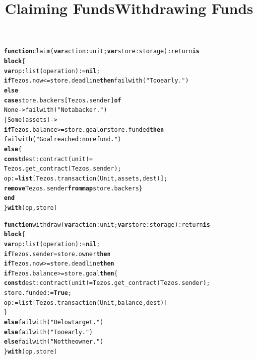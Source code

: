 \documentclass[wide]{slides}
\newcommand{\Kblock}[0]{\textbf{block}\xspace}
\newcommand{\Kcase}[0]{\textbf{case}\xspace}
\newcommand{\Kconst}[0]{\textbf{const}\xspace}
\newcommand{\Kelse}[0]{\textbf{else}\xspace}
\newcommand{\Kend}[0]{\textbf{end}\xspace}
\newcommand{\Kfrom}[0]{\textbf{from}\xspace}
\newcommand{\Kfunction}[0]{\textbf{function}\xspace}
\newcommand{\Kif}[0]{\textbf{if}\xspace}
\newcommand{\Kis}[0]{\textbf{is}\xspace}
\newcommand{\Klist}[0]{\textbf{list}\xspace}
\newcommand{\Kmap}[0]{\textbf{map}\xspace}
\newcommand{\Knil}[0]{\textbf{nil}\xspace}
\newcommand{\Kof}[0]{\textbf{of}\xspace}
\newcommand{\Kor}[0]{\textbf{or}\xspace}
\newcommand{\Kremove}[0]{\textbf{remove}\xspace}
\newcommand{\Kthen}[0]{\textbf{then}\xspace}
\newcommand{\KTrue}[0]{\textbf{True}\xspace}
\newcommand{\Kvar}[0]{\textbf{var}\xspace}
\newcommand{\Kwith}[0]{\textbf{with}\xspace}
\begin{document}
\begin{slide}
  \title{Claiming Funds}

  \begin{alltt}
\Kfunction claim (\Kvar action : unit; \Kvar store : storage) : return \Kis
  \Kblock \{
    \Kvar op : list (operation) := \Knil;
    \Kif Tezos.now <= store.deadline \Kthen failwith ("Too early.")
    \Kelse
      \Kcase store.backers[Tezos.sender] \Kof
         None -> failwith ("Not a backer.")
      | Some (assets) ->
          \Kif Tezos.balance >= store.goal \Kor store.funded \Kthen
            failwith ("Goal reached: no refund.")
          \Kelse \{
            \Kconst dest : contract (unit) =
               Tezos.get_contract (Tezos.sender);
            op := \Klist [Tezos.transaction (Unit, assets, dest)];
            \Kremove Tezos.sender \Kfrom \Kmap store.backers \}
      \Kend
  \} \Kwith (op, store)
  \end{alltt}

\end{slide}

\begin{slide}
  \title{Withdrawing Funds}

  \begin{alltt}
\Kfunction withdraw (\Kvar action : unit; \Kvar store : storage) : return \Kis
  \Kblock \{
    \Kvar op : list (operation) := \Knil;
    \Kif Tezos.sender = store.owner \Kthen
      \Kif Tezos.now >= store.deadline \Kthen
        \Kif Tezos.balance >= store.goal \Kthen \{
          \Kconst dest : contract (unit) = Tezos.get_contract (Tezos.sender);
          store.funded := \KTrue;
          op := list [Tezos.transaction (Unit, balance, dest)]
        \}
        \Kelse failwith ("Below target.")
      \Kelse failwith ("Too early.")
    \Kelse failwith ("Not the owner.")
  \} \Kwith (op, store)
  \end{alltt}

\end{slide}
\end{document}
